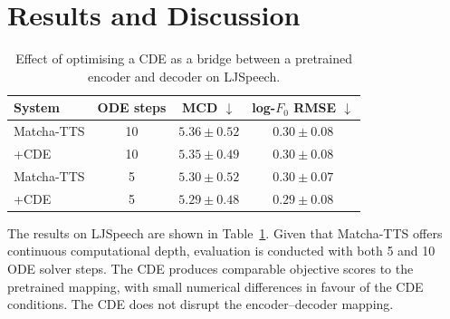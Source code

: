 \section{Results and Discussion}\label{sec:results}
\begin{table}
    \centering
    \caption{Effect of optimising a CDE as a bridge between a pretrained encoder and decoder on LJSpeech.}
    \begin{tabular}{l c c c}
    \toprule
    System & ODE steps & MCD $\downarrow$ & log-$F_0$ RMSE $\downarrow$ \\
    \midrule
    Matcha-TTS & 10
        & $5.36 \pm 0.52$ & $0.30 \pm 0.08$ \\
    \;\;+CDE & 10
        & $5.35 \pm 0.49$ & $0.30 \pm 0.08$ \\
    Matcha-TTS & 5
        & $5.30 \pm 0.52$ & $0.30 \pm 0.07$ \\
    \;\;+CDE & 5
        & $5.29 \pm 0.48$ & $0.29 \pm 0.08$ \\
    \bottomrule
    \end{tabular}
    \label{tab:results_matcha}
\end{table}
The results on LJSpeech are shown in Table~\ref{tab:results_matcha}. Given that Matcha-TTS offers continuous computational depth, evaluation is conducted with both 5 and 10 \ac{ODE} solver steps. The \ac{CDE} produces comparable objective scores to the pretrained mapping, with small numerical differences in favour of the \ac{CDE} conditions. The \ac{CDE} does not disrupt the encoder--decoder mapping.

